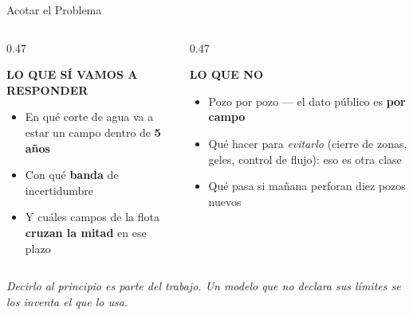 \documentclass[aspectratio=169, 11pt]{beamer}
\begin{document}
\begin{frame}[shrink=8]{Acotar el Problema}
  \vspace{2pt}
  \begin{columns}[T]
    \begin{column}{0.47\textwidth}
      \begin{tcolorbox}[colback=arcaGray, colframe=codeGreen, boxrule=0pt,
        leftrule=3pt, arc=3pt, left=8pt, right=8pt, top=6pt, bottom=6pt]
        {\scriptsize\color{codeGreen}\bfseries LO QUE SÍ VAMOS A RESPONDER}\\[5pt]
        {\footnotesize\color{textMuted}
        \begin{itemize}\setlength{\itemsep}{3pt}
          \item[{\color{codeGreen}\scriptsize\faCheck}]
            En qué corte de agua va a estar un campo dentro de \textbf{5 años}
          \item[{\color{codeGreen}\scriptsize\faCheck}]
            Con qué \textbf{banda} de incertidumbre
          \item[{\color{codeGreen}\scriptsize\faCheck}]
            Y cuáles campos de la flota \textbf{cruzan la mitad} en ese plazo
        \end{itemize}}
      \end{tcolorbox}
    \end{column}
    \begin{column}{0.47\textwidth}
      \begin{tcolorbox}[colback=arcaGray, colframe=arcaRed, boxrule=0pt,
        leftrule=3pt, arc=3pt, left=8pt, right=8pt, top=6pt, bottom=6pt]
        {\scriptsize\color{arcaRed}\bfseries LO QUE NO}\\[5pt]
        {\footnotesize\color{textMuted}
        \begin{itemize}\setlength{\itemsep}{3pt}
          \item[{\color{arcaRed}\scriptsize\faTimes}]
            Pozo por pozo --- el dato público es \textbf{por campo}
          \item[{\color{arcaRed}\scriptsize\faTimes}]
            Qué hacer para \emph{evitarlo} (cierre de zonas, geles, control de
            flujo): eso es otra clase
          \item[{\color{arcaRed}\scriptsize\faTimes}]
            Qué pasa si mañana perforan diez pozos nuevos
        \end{itemize}}
      \end{tcolorbox}
    \end{column}
  \end{columns}
  \vspace{8pt}
  {\footnotesize\color{arcaDark}\itshape
   Decirlo al principio es parte del trabajo. Un modelo que no declara sus
   límites se los inventa el que lo usa.}
\end{frame}
\end{document}
